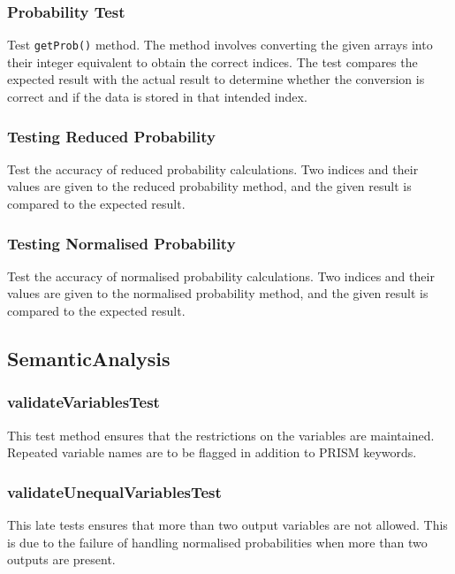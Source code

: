 \documentclass[report.tex]{subfiles}
\begin{document}
\subsubsection{Probability Test} %
\label{ssub:probability_test}
Test \texttt{getProb()} method. The method involves converting the given arrays
into their integer equivalent to obtain the correct indices. The test compares
the expected result with the actual result to determine whether the conversion
is correct and if the data is stored in that intended index.

\subsubsection{Testing Reduced Probability} %
\label{ssub:testing_reduced_probability}
Test the accuracy of reduced probability calculations. Two indices and their
values are given to the reduced probability method, and the given result is
compared to the expected result.

\subsubsection{Testing Normalised Probability} %
\label{ssub:testing_normalised_probability}
Test the accuracy of normalised probability calculations. Two indices and their
values are given to the normalised probability method, and the given result is
compared to the expected result.

\subsection{SemanticAnalysis} %
\label{sub:semanticanalysis}
\subsubsection{validateVariablesTest} %
\label{ssub:validatevariablestest}
This test method ensures that the restrictions on the variables are maintained.
Repeated variable names are to be flagged in addition to PRISM keywords.

\subsubsection{validateUnequalVariablesTest} %
\label{ssub:validateunequalvariablestest}
This late tests ensures that more than two output variables are not allowed.
This is due to the failure of handling normalised probabilities when more than
two outputs are present.
\end{document}
